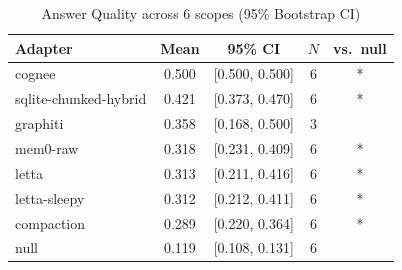 \begin{table}[t]
\centering
\caption{Answer Quality across 6 scopes (95\% Bootstrap CI)}
\label{tab:main_results}
\begin{tabular}{lcccc}
\toprule
Adapter & Mean & 95\% CI & $N$ & vs.\ null \\
\midrule
  cognee & 0.500 & [0.500, 0.500] & 6 & * \\
  sqlite-chunked-hybrid & 0.421 & [0.373, 0.470] & 6 & * \\
  graphiti & 0.358 & [0.168, 0.500] & 3 &  \\
  mem0-raw & 0.318 & [0.231, 0.409] & 6 & * \\
  letta & 0.313 & [0.211, 0.416] & 6 & * \\
  letta-sleepy & 0.312 & [0.212, 0.411] & 6 & * \\
  compaction & 0.289 & [0.220, 0.364] & 6 & * \\
  null & 0.119 & [0.108, 0.131] & 6 &  \\
\bottomrule
\end{tabular}
\end{table}